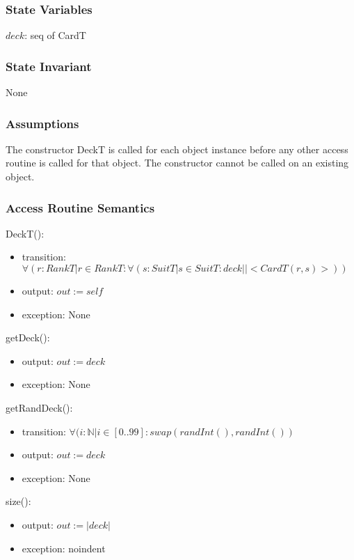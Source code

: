 \documentclass[12pt]{article}
\begin{document}
\subsubsection* {State Variables}

$deck$: seq of CardT\\ 

\subsubsection* {State Invariant}

None

\subsubsection* {Assumptions}

The constructor DeckT is called for each object instance before any other
access routine is called for that object.  The constructor cannot be called on
an existing object.

\subsubsection* {Access Routine Semantics}

DeckT():
\begin{itemize}
\item transition: $\forall(r : RankT | r \in RankT : \forall (s : SuitT | s \in SuitT : deck || <CardT(r,s)>))$
\item output: $out := \mathit{self}$
\item exception: None
\end{itemize}

\noindent getDeck():
\begin{itemize}
\item output: $out := deck$
\item exception: None
\end{itemize}

\noindent getRandDeck():
\begin{itemize} 
\item transition: $\forall (i : \mathbb{N} | i \in [0..99] : swap(randInt(),randInt())$ 
\item output: $out := deck$
\item exception: None
\end{itemize}

\noindent size():
\begin{itemize}
\item output: $out := |deck|$
\item exception: noindent
\end{itemize} 
\end{document}
